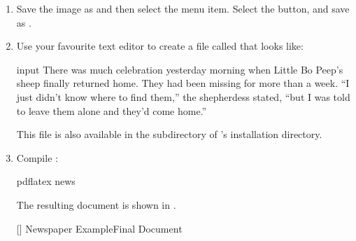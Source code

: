 \begin{enumerate}
The text on the  should now be
. Click on it to finish.
You will be asked if you want to start over with another object. 
Click  to close the dialog.

\item Save the image as  and then select the
 menu item. Select the
 button, and save as .

\item Use your favourite text editor to create a file called
 that looks like:
\begin{codebox}
\codepar
{}
\gls{input}
There was much celebration yesterday morning when 
Little Bo Peep's sheep finally returned home. They 
had been missing for more than a week.
\codepar
``I just didn't know where to find them,'' the 
shepherdess stated, ``but I was told to leave them 
alone and they'd come home.''
\codepar
{}
\end{codebox}
This file is also available in the  subdirectory
of \FlowframTk's installation directory.

\item Compile :
\begin{terminal}
pdflatex news
\end{terminal}
The resulting document is shown in .

[]
{}
{Newspaper Example\dash Final Document}

\end{enumerate}

